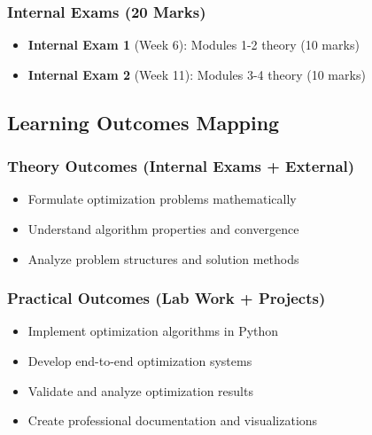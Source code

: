 \documentclass[
  letterpaper,
  DIV=11,
  numbers=noendperiod]{scrreprt}
\providecommand{\tightlist}{%
  \setlength{\itemsep}{0pt}\setlength{\parskip}{0pt}}
\begin{document}
\subsubsection*{Internal Exams (20
Marks)}\label{internal-exams-20-marks}

\begin{itemize}
\tightlist
\item
  \textbf{Internal Exam 1} (Week 6): Modules 1-2 theory (10 marks)
\item
  \textbf{Internal Exam 2} (Week 11): Modules 3-4 theory (10 marks)
\end{itemize}

\subsection*{Learning Outcomes Mapping}\label{learning-outcomes-mapping}

\subsubsection*{Theory Outcomes (Internal Exams +
External)}\label{theory-outcomes-internal-exams-external}

\begin{itemize}
\tightlist
\item
  Formulate optimization problems mathematically
\item
  Understand algorithm properties and convergence
\item
  Analyze problem structures and solution methods
\end{itemize}

\subsubsection*{Practical Outcomes (Lab Work +
Projects)}\label{practical-outcomes-lab-work-projects}

\begin{itemize}
\tightlist
\item
  Implement optimization algorithms in Python
\item
  Develop end-to-end optimization systems
\item
  Validate and analyze optimization results
\item
  Create professional documentation and visualizations
\end{itemize}
\end{document}
